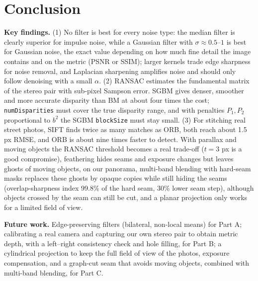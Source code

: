 \documentclass[a4paper,12pt]{article}
\begin{document}
\section{Conclusion}\label{sec:concl}
\textbf{Key findings.} (1) No filter is best for every noise type: the median filter is clearly superior for impulse noise, while a Gaussian filter with $\sigma\approx0.5$--$1$ is best for Gaussian noise, the exact value depending on how much fine detail the image contains and on the metric (PSNR or SSIM); larger kernels trade edge sharpness for noise removal, and Laplacian sharpening amplifies noise and should only follow denoising with a small $\alpha$. (2) RANSAC estimates the fundamental matrix of the stereo pair with sub-pixel Sampson error. SGBM gives denser, smoother and more accurate disparity than BM at about four times the cost; \texttt{numDisparities} must cover the true disparity range, and with penalties $P_1,P_2$ proportional to $b^2$ the SGBM \texttt{blockSize} must stay small. (3) For stitching real street photos, SIFT finds twice as many matches as ORB, both reach about 1.5 px RMSE, and ORB is about nine times faster to detect. With parallax and moving objects the RANSAC threshold becomes a real trade-off ($t=3$ px is a good compromise), feathering hides seams and exposure changes but leaves ghosts of moving objects, on our panorama, multi-band blending with hard-seam masks replaces these ghosts by opaque copies while still hiding the seams (overlap-sharpness index 99.8\% of the hard seam, 30\% lower seam step), although objects crossed by the seam can still be cut, and a planar projection only works for a limited field of view.

\textbf{Future work.} Edge-preserving filters (bilateral, non-local means) for Part A; calibrating a real camera and capturing our own stereo pair to obtain metric depth, with a left--right consistency check and hole filling, for Part B; a cylindrical projection to keep the full field of view of the photos, exposure compensation, and a graph-cut seam that avoids moving objects, combined with multi-band blending, for Part C.

\end{document}
